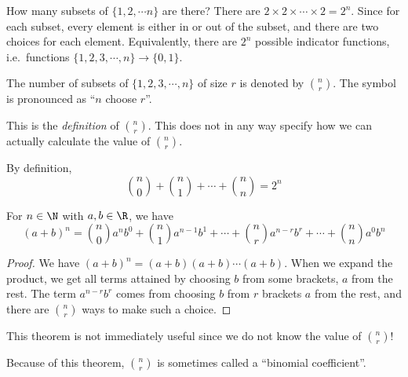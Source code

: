\documentclass[a4paper]{article}
\begin{document}
\begin{eg}
  How many subsets of $\{1, 2, \cdots n\}$ are there? There are $2\times 2\times \cdots \times 2 = 2^n$. Since for each subset, every element is either in or out of the subset, and there are two choices for each element. Equivalently, there are $2^n$ possible indicator functions, i.e.\ functions $\{1, 2, 3, \cdots, n\} \to \{0, 1\}$.
\end{eg}

\begin{defi}
  The number of subsets of $\{1, 2, 3, \cdots, n\}$ of size $r$ is denoted by $\binom{n}{r}$. The symbol is pronounced as ``$n$ choose $r$''.
\end{defi}
This is the \emph{definition} of $\binom{n}{r}$. This does not in any way specify how we can actually calculate the value of $\binom{n}{r}$.

\begin{prop}
  By definition,
  \[
    \binom{n}{0} + \binom{n}{1} + \cdots + \binom{n}{n} = 2^n
  \]
\end{prop}

\begin{thm}
  For $n\in \N$ with $a, b\in \R$, we have
  \[
    (a + b)^n = \binom{n}{0}a^n b^0 + \binom{n}{1}a^{n-1}b^1 + \cdots + \binom{n}{r}a^{n - r}b^r + \cdots + \binom{n}{n}a^0b^n
  \]
\end{thm}

\begin{proof}
  We have $(a + b)^n = (a + b)(a + b)\cdots (a + b)$. When we expand the product, we get all terms attained by choosing $b$ from some brackets, $a$ from the rest. The term $a^{n - r}b^r$ comes from choosing $b$ from $r$ brackets $a$ from the rest, and there are $\binom{n}{r}$ ways to make such a choice.
\end{proof}
This theorem is not immediately useful since we do not know the value of $\binom{n }{r}$!

Because of this theorem, $\binom{n }{r}$ is sometimes called a ``binomial coefficient''.
\end{document}
